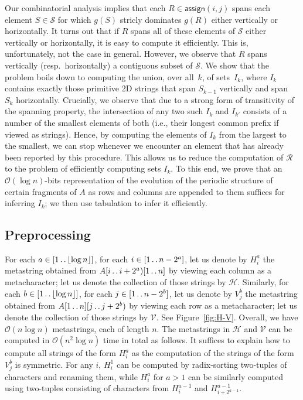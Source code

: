 \documentclass[11pt,letterpaper]{article}
\newcommand{\cO}{\mathcal{O}}
\newcommand{\floor}[1]{\left\lfloor #1 \right\rfloor}
\def\dd{\mathinner{.\,.}}
\newcommand{\assign}{\textsf{assign}}
\renewcommand{\S}{\mathcal{S}}
\newcommand{\hmeta}[2]{H_{#1}^{#2}}
\newcommand{\vmeta}[2]{V_{#1}^{#2}}
\begin{document}
Our combinatorial analysis implies that each $R \in \assign(i,j)$ spans each element $S \in \mathcal{S}$ for which $g(S)$ stricly dominates $g(R)$ either vertically or horizontally.
It turns out that if $R$ spans all of these elements of $\S$ either vertically or horizontally, it is easy to compute it efficiently.
This is, unfortunately, not the case in general.
However, we observe that $R$ spans vertically (resp.~horizontally) a contiguous subset of $\S$.
We show that the problem boils down to computing the union, over all~$k$, of sets~$I_k$, where $I_k$ contains exactly those primitive 2D strings that span $S_{k-1}$ vertically and span~$S_k$ horizontally.
Crucially, we observe that due to a strong form of transitivity of the spanning property, the intersection of any two such $I_k$ and $I_{k'}$ consists of a number of the smallest elements of both (i.e., their longest common prefix if viewed as strings).
Hence, by computing the elements of $I_k$ from the largest to the smallest, we can stop whenever we encounter an element that has already been reported by this procedure.
This allows us to reduce the computation of $\mathcal{R}$ to the problem of efficiently computing sets $I_k$.
To this end, we prove that an $\cO(\log n)$-bits representation of the evolution of the periodic structure of certain fragments of $A$ as rows and columns are appended to them suffices for inferring $I_k$; we then use tabulation to infer it efficiently.

\subsection{Preprocessing}

For each $a \in [1 \dd \floor{\log n}]$, for each $i \in [1 \dd n-2^a]$, let us denote by $\hmeta{i}{a}$ the metastring obtained from $A[i \dd i+2^a)[1 \dd n]$ by viewing each column as a metacharacter; let us denote the collection of those strings by $\mathcal{H}$. 
Similarly, for each $b \in [1 \dd \floor{\log n}]$, for each $j \in [1 \dd n-2^b]$, let us denote by $\vmeta{j}{b}$ the metastring obtained from $A[1 \dd n][j \dd j+2^b)$ by viewing each row as a metacharacter; let us denote the collection of those strings by $\mathcal{V}$. See Figure~\ref{fig:H-V}.
Overall, we have $\cO(n\log n)$ metastrings, each of length $n$.
The metastrings in $\mathcal{H}$ and $\mathcal{V}$ can be computed in $\cO(n^2 \log n)$ time in total as follows.
It suffices to explain how to compute all strings of the form $\hmeta{i}{a}$ as the computation of the strings of the form $\vmeta{j}{b}$ is symmetric.
For any $i$, $\hmeta{i}{1}$ can be computed by radix-sorting two-tuples of characters and renaming them, while $\hmeta{i}{a}$ for $a>1$ can be similarly computed using two-tuples consisting of characters from $\hmeta{i}{a-1}$ and $\hmeta{i+2^{a-1}}{a-1}$.
\end{document}
